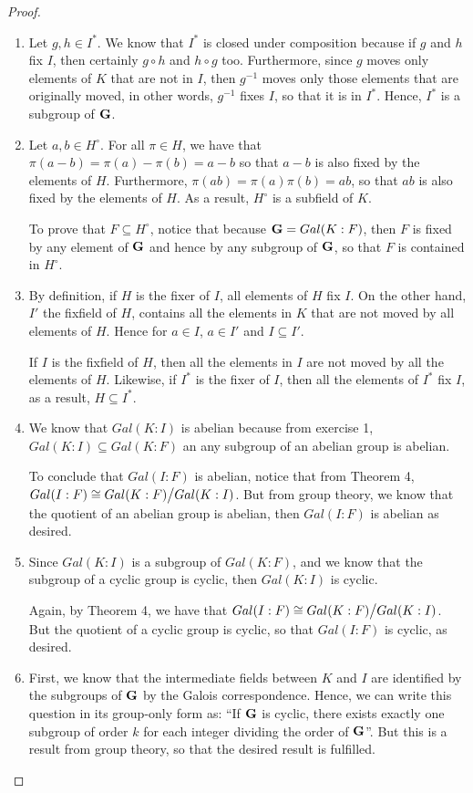 \begin{proof}
 \begin{enumerate}
     \item Let $g,h\in I^\ast$. We know that $I^\ast$ is closed under composition because if $g$ and $h$ fix $I$, then certainly $g\circ h$ and $h\circ g$ too. Furthermore, since $g$ moves only elements of $K$ that are not in $I$, then $g^{-1}$ moves only those elements that are originally moved, in other words, $g^{-1}$ fixes $I$, so that it is in $I^\ast$. Hence, $I^\ast$ is a subgroup of $\mathbf{G}$.
     \item Let $a,b\in H^\circ$. For all $\pi\in H$, we have that $\pi(a-b)=\pi(a)-\pi(b)=a-b$ so that $a-b$ is also fixed by the elements of $H$. Furthermore, $\pi(ab)=\pi(a)\pi(b)=ab$, so that $ab$ is also fixed by the elements of $H$. As a result, $H^\circ$ is a subfield of $K$.

     To prove that $F\subseteq H^\circ$, notice that because $\mathbf{G}=Gal(K:F)$, then $F$ is fixed by any element of $\mathbf{G}$ and hence by any subgroup of $\mathbf{G}$, so that $F$ is contained in $H^\circ$.
     \item By definition, if $H$ is the fixer of $I$, all elements of $H$ fix $I$. On the other hand, $I'$ the fixfield of $H$, contains all the elements in $K$ that are not moved by all elements of $H$. Hence for $a\in I$, $a\in I'$ and $I\subseteq I'$.

     If $I$ is the fixfield of $H$, then all the elements in $I$ are not moved by all the elements of $H$. Likewise, if $I^\ast$ is the fixer of $I$, then all the elements of $I^\ast$ fix $I$, as a result, $H\subseteq I^\ast$.
     \item We know that $Gal(K:I)$ is abelian because from exercise 1, $Gal(K:I)\subseteq Gal(K:F)$ an any subgroup of an abelian group is abelian.

     To conclude that $Gal(I:F)$ is abelian, notice that from Theorem 4, $Gal(I:F)\cong{\textstyle Gal(K:F)}\big/{\textstyle Gal(K:I)}$. But from group theory, we know that the quotient of an abelian group is abelian, then $Gal(I:F)$ is abelian as desired.
     \item Since $Gal(K:I)$ is a subgroup of $Gal(K:F)$, and we know that the subgroup of a cyclic group is cyclic, then $Gal(K:I)$ is cyclic.

     Again, by Theorem 4, we have that $Gal(I:F)\cong{\textstyle Gal(K:F)}\big/{\textstyle Gal(K:I)}$. But the quotient of a cyclic group is cyclic, so that $Gal(I:F)$ is cyclic, as desired.
     \item First, we know that the intermediate fields between $K$ and $I$ are identified by the subgroups of $\mathbf{G}$ by the Galois correspondence. Hence, we can write this question in its group-only form as: ``If $\mathbf{G}$ is cyclic, there exists exactly one subgroup of order $k$ for each integer dividing the order of $\mathbf{G}$''. But this is a result from group theory, so that the desired result is fulfilled.
 \end{enumerate}
\end{proof}

